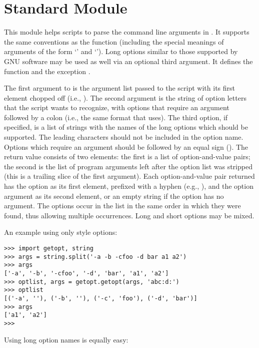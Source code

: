 \section{Standard Module }
\label{module-getopt}

This module helps scripts to parse the command line arguments in
.
It supports the same conventions as the \UNIX{}
function (including the special meanings of arguments of the form
`\code{-}' and `\code{-}\code{-}').
Long options similar to those supported by
GNU software may be used as well via an optional third argument.
It defines the function
and the exception
.

The first argument to
is the argument list passed to the script with its first element
chopped off (i.e.,
).
The second argument is the string of option letters that the
script wants to recognize, with options that require an argument
followed by a colon (i.e., the same format that \UNIX{}
uses).
The third option, if specified, is a list of strings with the names of
the long options which should be supported.  The leading 
characters should not be included in the option name.  Options which
require an argument should be followed by an equal sign ().
The return value consists of two elements: the first is a list of
option-and-value pairs; the second is the list of program arguments
left after the option list was stripped (this is a trailing slice of the
first argument).
Each option-and-value pair returned has the option as its first element,
prefixed with a hyphen (e.g.,
),
and the option argument as its second element, or an empty string if the
option has no argument.
The options occur in the list in the same order in which they were
found, thus allowing multiple occurrences.  Long and short options may
be mixed.

An example using only \UNIX{} style options:

\begin{verbatim}
>>> import getopt, string
>>> args = string.split('-a -b -cfoo -d bar a1 a2')
>>> args
['-a', '-b', '-cfoo', '-d', 'bar', 'a1', 'a2']
>>> optlist, args = getopt.getopt(args, 'abc:d:')
>>> optlist
[('-a', ''), ('-b', ''), ('-c', 'foo'), ('-d', 'bar')]
>>> args
['a1', 'a2']
>>> 
\end{verbatim}
%
Using long option names is equally easy:

